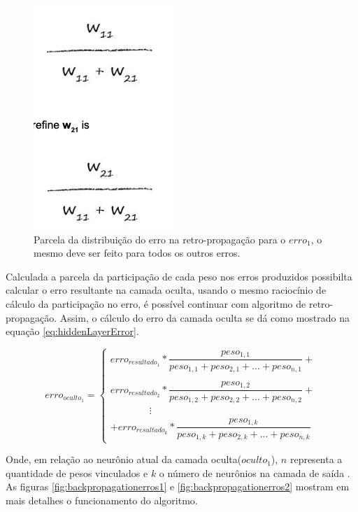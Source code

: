 \begin{apendicesenv}
		\begin{figure}[H]
			\centering
			\caption{Parcela da distribuição do erro na retro-propagação para o $erro_1$, o mesmo deve ser feito para todos os outros erros.}
			\label{fig:backpropagationErrors}
			\includegraphics[width=0.4\linewidth]{images/TEMPbackpropagationErros}
		\end{figure}
		
		\par Calculada a parcela da participação de cada peso nos erros produzidos possibilta calcular o erro resultante na camada oculta, usando o mesmo raciocínio de cálculo da participação no erro, é possível continuar com algoritmo de retro-propagação. Assim, o cálculo do erro da camada oculta se dá como mostrado na equação \ref{eq:hiddenLayerError}.
		
		\begin{equation}
			\label{eq:hiddenLayerError}
			erro_{oculto_1} = \begin{cases} 
				erro_{resultado_1}  * \dfrac{peso_{1,1}}{peso_{1,1} + peso_{2,1}+ ... + peso_{n,1}}  + \\\\
				erro_{resultado_2}  * \dfrac{peso_{1,2}}{peso_{1,2} + peso_{2,2}+ ... + peso_{n,2}}  + \\
				\qquad\qquad \vdots \\
				+ erro_{resultado_k}  * \dfrac{peso_{1,k}}{peso_{1,k} + peso_{2,k}+ ... + peso_{n,k}} 
			\end{cases}			 
		\end{equation}
	
		\par Onde, em relação ao neurônio atual da camada oculta($oculto_1$), $n$ representa a quantidade de pesos vinculados e $k$ o número de neurônios na camada de saída . As figuras \ref{fig:backpropagationerros1} e \ref{fig:backpropagationerros2} mostram em mais detalhes o funcionamento do algoritmo.
		

\end{apendicesenv}
